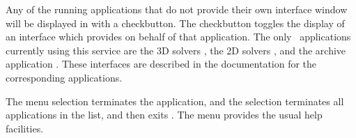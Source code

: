 Any of the running applications that do not provide their own
interface window will be displayed in  with a
checkbutton.  The checkbutton toggles the display of an interface
which  provides on behalf of that application.  The only
\OOMMF\ applications currently using this service are the 3D solvers
, the 2D solvers , and the archive application
.  These interfaces are described in the
documentation for the corresponding applications.

The menu selection  terminates the 
application, and the  selection
terminates all applications in the  list,
and then exits .  The menu  provides the usual
help facilities.
